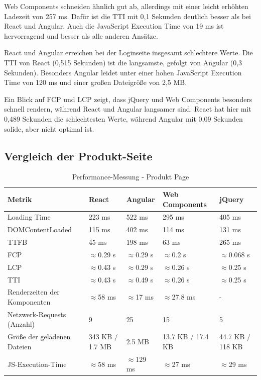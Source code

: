 \documentclass[oneside]{ausarbeitung}
\begin{document}
Web Components schneiden ähnlich gut ab, allerdings mit einer leicht erhöhten Ladezeit von 257 ms. Dafür ist die TTI mit 0,1 Sekunden deutlich besser als bei React und Angular. Auch die JavaScript Execution Time von 19 ms ist hervorragend und besser als alle anderen Ansätze.

React und Angular erreichen bei der Loginseite insgesamt schlechtere Werte. Die TTI von React (0,515 Sekunden) ist die langsamste, gefolgt von Angular (0,3 Sekunden). Besonders Angular leidet unter einer hohen JavaScript Execution Time von 120 ms und einer großen Dateigröße von 2,5 MB.

Ein Blick auf FCP und LCP zeigt, dass jQuery und Web Components besonders schnell rendern, während React und Angular langsamer sind. React hat hier mit 0,489 Sekunden die schlechtesten Werte, während Angular mit 0,09 Sekunden solide, aber nicht optimal ist.
\subsection{Vergleich der Produkt-Seite}

\begin{table}[H]
\centering
\caption{Performance-Messung - Produkt Page}
\begin{tabular}{|p{3.5cm}|p{2.5cm}|p{2.5cm}|p{2.5cm}|p{2.5cm}|}
\hline
\textbf{Metrik}                  & \textbf{React} & \textbf{Angular} & \textbf{Web Components} & \textbf{jQuery} \\ \hline
Loading Time                     & 223 ms        & 522 ms           & 295 ms                 & 405 ms          \\ \hline
DOMContentLoaded                 & 115 ms        & 402 ms           & 114 ms                 & 131 ms          \\ \hline
TTFB                             & 45 ms        & 198 ms           & 63 ms                  & 265 ms          \\ \hline
FCP                              & $\approx$0.29 s  & $\approx$0.29 s  & $\approx$0.2 s        & $\approx$0.068 s  \\ \hline
LCP                              & $\approx$0.43 s  & $\approx$0.29 s  & $\approx$0.26 s       & $\approx$0.25 s \\ \hline
TTI                              & $\approx$0.43 s  & $\approx$0.49 s  & $\approx$0.26 s       & $\approx$0.25 s \\ \hline
Renderzeiten der Komponenten     & $\approx$58 ms & $\approx$17 ms   & $\approx$27.8 ms          & -  \\ \hline
Netzwerk-Requests (Anzahl)       & 9              & 25               & 15                    & 5               \\ \hline
Größe der geladenen Dateien      & 343 KB / 1.7 MB & 2.5 MB          & 13.7 KB / 17.4 KB     & 44.7 KB / 118 KB \\ \hline
JS-Execution-Time                & $\approx$58 ms       & $\approx$129 ms          & $\approx$27 ms                & $\approx$29 ms         \\ \hline
\end{tabular}
\end{table}
\end{document}
